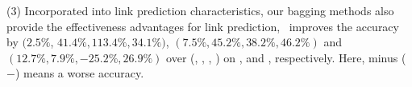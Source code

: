 \sstab (3) Incorporated into link prediction characteristics, our
bagging methods also provide the effectiveness advantages for link prediction,
\eg~\Biased improves the accuracy by $(2.5\%$, $41.4\%, 113.4\%, 34.1\%)$, $(7.5\%, 45.2\%, 38.2\%, 46.2\%)$ and $(12.7\%, 7.9\%, -25.2\%, 26.9\%)$
over (\NMF, \Aa, \RA, \BIGCLAM) on \Digg, \YouTube and \Wikipedia, respectively. Here, minus ($-$) means a worse accuracy.













%
%
%
%
%
%


